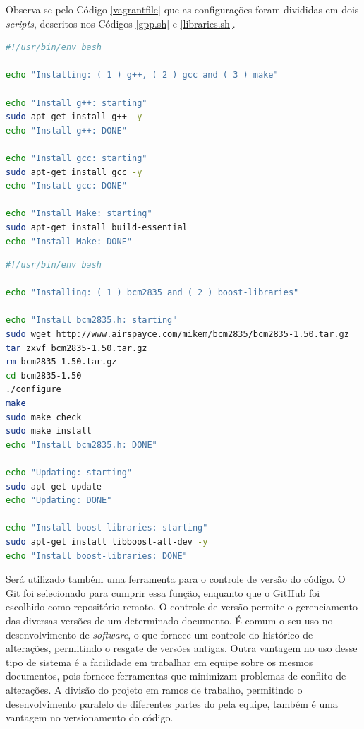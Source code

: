 \par
Observa-se pelo Código \ref{vagrantfile} que as configurações foram divididas em
dois \textit{scripts}, descritos nos Códigos \ref{gpp.sh} e \ref{libraries.sh}.
\par
\begin{lstlisting}[language=bash, label=gpp.sh, caption=\textsf{Script} para instalação
de ferramentas de compilação]
#!/usr/bin/env bash

echo "Installing: ( 1 ) g++, ( 2 ) gcc and ( 3 ) make"

echo "Install g++: starting"
sudo apt-get install g++ -y
echo "Install g++: DONE"

echo "Install gcc: starting"
sudo apt-get install gcc -y
echo "Install gcc: DONE"

echo "Install Make: starting"
sudo apt-get install build-essential
echo "Install Make: DONE"
\end{lstlisting}
\par
\begin{lstlisting}[language=bash, label=libraries.sh, caption=\textsf{Script} para instalação
de bibliotecas externas]
#!/usr/bin/env bash

echo "Installing: ( 1 ) bcm2835 and ( 2 ) boost-libraries"

echo "Install bcm2835.h: starting"
sudo wget http://www.airspayce.com/mikem/bcm2835/bcm2835-1.50.tar.gz
tar zxvf bcm2835-1.50.tar.gz
rm bcm2835-1.50.tar.gz
cd bcm2835-1.50
./configure
make
sudo make check
sudo make install
echo "Install bcm2835.h: DONE"

echo "Updating: starting"
sudo apt-get update
echo "Updating: DONE"

echo "Install boost-libraries: starting"
sudo apt-get install libboost-all-dev -y
echo "Install boost-libraries: DONE"
\end{lstlisting}
\par
Será utilizado também uma ferramenta para o controle de versão do código. O
\textsf{Git} foi selecionado para cumprir essa função, enquanto que o
\textsf{GitHub} foi escolhido como repositório remoto. O controle de versão permite
o gerenciamento das diversas versões de um determinado documento. É comum o
seu uso no desenvolvimento de \textit{software}, o que fornece um controle do histórico
de alterações, permitindo o resgate de versões antigas. Outra vantagem no uso desse
tipo de sistema é a facilidade em trabalhar em equipe sobre os mesmos documentos,
pois fornece ferramentas que minimizam problemas de conflito de alterações. A
divisão do projeto em ramos de trabalho, permitindo o desenvolvimento paralelo
de diferentes partes do \software pela equipe, também é uma vantagem no
versionamento do código.